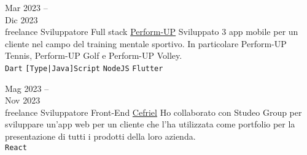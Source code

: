 \documentclass[9pt]{developercv} %
\begin{document}
	
	



\begin{entrylist}
	\entry
	{Mar 2023 -- \\Dic 2023\\\footnotesize{freelance}}
	{Sviluppatore Full stack}
	{\href{https://www.perform-up.com/}{Perform-UP}}
	{
		Sviluppato 3 app mobile per un cliente nel campo del training mentale sportivo. In particolare Perform-UP Tennis, Perform-UP Golf e Perform-UP Volley.
		\\
		\texttt{Dart}\slashsep
		\texttt{[Type|Java]Script}\slashsep
		\texttt{NodeJS}\slashsep
		\texttt{Flutter}\slashsep
	}
\end{entrylist}

\begin{entrylist}
	\entry
	{Mag 2023 -- \\Nov 2023\\\footnotesize{freelance}}
	{Sviluppatore Front-End}
	{\href{https://www.studeogroup.it/}{Cefriel}}
	{
		Ho collaborato con Studeo Group per sviluppare un'app web per un cliente che l'ha utilizzata come portfolio per la presentazione di tutti i prodotti della loro azienda. 
		\\
		\texttt{React}\slashsep
	}
\end{entrylist}
\end{document}
